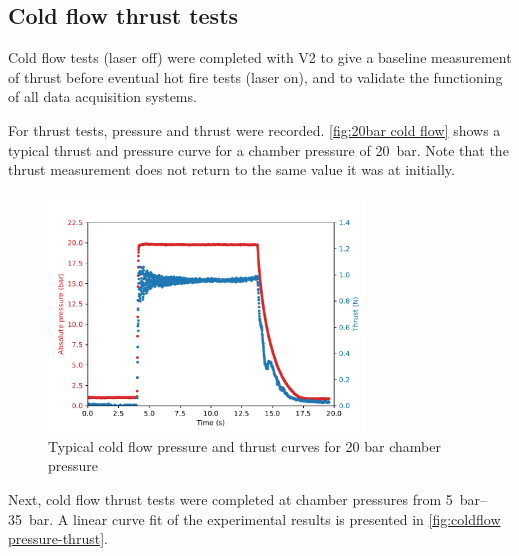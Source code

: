        \subsection{Cold flow thrust tests}

            Cold flow tests (laser off) were completed with V2 to give a baseline measurement of thrust before eventual hot fire tests (laser on), and to validate the functioning of all data acquisition systems.

            For thrust tests, pressure and thrust were recorded. \autoref{fig:20bar cold flow} shows a typical thrust and pressure curve for a chamber pressure of \qty{20}{bar}. Note that the thrust measurement does not return to the same value it was at initially.

            \begin{figure}[!ht]
                \centering
                \includegraphics[width=0.75\textwidth]{assets/4 experiments/Example thrust 20 bar.pdf}
                \caption{Typical cold flow pressure and thrust curves for 20 bar chamber pressure}
                \label{fig:20bar cold flow}
            \end{figure}

            Next, cold flow thrust tests were completed at chamber pressures from \qtyrange{5}{35}{bar}. A linear curve fit of the experimental results is presented in \autoref{fig:coldflow pressure-thrust}.


